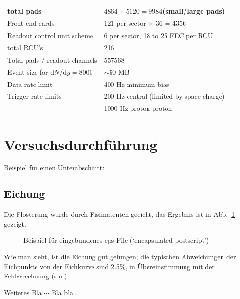 \documentclass[12pt, a4paper]{article}
\begin{document}
\begin{table}[htb]
\begin{center}
\begin{tabular}{|l|l|}
\quad total pads		& $4864 + 5120 = 9984$\quad (small/large pads) \\ 
\hline
Front end cards                 & 121 per sector $\times$ 36 = 4356 \\
Readout control unit scheme     & 6 per sector, 18 to 25 FEC per RCU \\
total RCU's                     & 216 \\
Total pads / readout channels   & 557568\\
\hline
Event size \hspace{12mm} for d$N$/d$y = 8000$ & $\sim$60 MB\\
Data rate limit                 & 400 Hz minimum bias\\
Trigger rate limits             & 200 Hz central (limited by space charge)\\
                                & 1000 Hz proton-proton\\ \hline
\end{tabular}
\end{center}
\end{table}

\section{Versuchsdurchf\"uhrung}

Beispiel f\"ur einen Unterabschnitt:

\subsection{Eichung}
Die Flosterung wurde durch Fisimatenten geeicht, das Ergebnis ist in
Abb.~\ref{eichung} gezeigt. 
\begin{figure}[h]
  \centering
  \caption{Beispiel f\"ur eingebundenes eps-File (`encapsulated postscript')}
  \label{eichung}          
\end{figure}
Wie man sieht, ist die Eichung gut gelungen; die typischen Abweichungen der 
Eichpunkte von der Eichkurve sind 2.5\%, in \"Ubereinstimmung mit der 
Fehlerrechnung (s.u.).

Weiteres Bla $\cdots$ Bla bla $\ldots$
\end{document}
